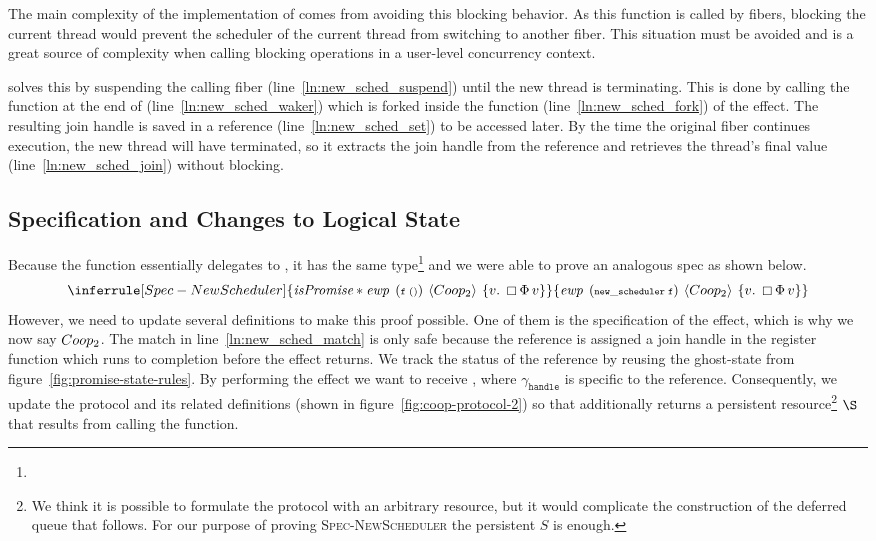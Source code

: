 The main complexity of the implementation of  comes from avoiding this blocking behavior.
As this function is called by fibers, blocking the current thread would prevent the scheduler of the current thread from switching to another fiber.
This situation must be avoided and is a great source of complexity when calling blocking operations in a user-level concurrency context.

 solves this by suspending the calling fiber (line~\ref{ln:new_sched_suspend}) until the new thread is terminating.
This is done by calling the  function at the end of  (line~\ref{ln:new_sched_waker}) which is forked inside the  function (line~\ref{ln:new_sched_fork}) of the \esuspend{} effect.
The resulting join handle is saved in a reference (line~\ref{ln:new_sched_set}) to be accessed later.
By the time the original fiber continues execution, the new thread will have terminated, so it extracts the join handle from the reference and retrieves the thread's final value (line~\ref{ln:new_sched_join}) without blocking.

\subsection{Specification and Changes to Logical State}
Because the function essentially delegates to , it has the same type\footnote{} and we were able to prove an analogous spec as shown below.
\[
  \inferrule[Spec-NewScheduler]
  {\gsIsPr{} \ast \ewp{f\; ()}{\proto{2}}{v.\; \always \Phi\, v}}
  {\ewp{new\_scheduler\; f}{\proto{2}}{v.\; \always \Phi\, v}}
\]
%
However, we need to update several definitions to make this proof possible.
One of them is the specification of the \esuspend{} effect, which is why we now say \(Coop_{2}\).
The match in line~\ref{ln:new_sched_match} is only safe because the reference is assigned a join handle in the register function which runs to completion before the effect returns.
We track the status of the reference by reusing the \gsOneShotAssign{} ghost-state from figure~\ref{fig:promise-state-rules}.
By performing the \esuspend{} effect we want to receive , where \(\gamma_{{\scriptscriptstyle \mathtt{handle}}}\) is specific to the reference.
Consequently, we update the protocol and its related definitions (shown in figure~\ref{fig:coop-protocol-2}) so that \esuspend{} additionally returns a persistent resource\footnote{We think it is possible to formulate the protocol with an arbitrary resource, but it would complicate the construction of the deferred queue that follows. For our purpose of proving \textsc{Spec-NewScheduler} the persistent \(S\) is enough.}
\(\S\) that results from calling the  function.

